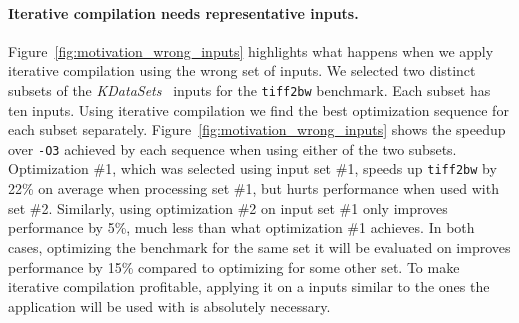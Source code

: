     \paragraph{Iterative compilation needs representative inputs.} 

    Figure~\ref{fig:motivation_wrong_inputs} highlights what happens when we apply iterative compilation using the wrong set of inputs. We
    selected two distinct subsets of the \textit{KDataSets}~\cite{chen10,chen12a} inputs for the \texttt{tiff2bw} benchmark. Each subset
    has ten inputs. Using iterative compilation we find the best optimization sequence for each subset separately.
    Figure~\ref{fig:motivation_wrong_inputs} shows the speedup over \texttt{-O3} achieved by each sequence when using either of the two
    subsets. Optimization \#1, which was selected using input set \#1, speeds up \texttt{tiff2bw} by 22\% on average when processing set
    \#1, but hurts performance when used with set \#2. Similarly, using optimization \#2 on input set \#1 only improves performance by 5\%,
    much less than what optimization \#1 achieves. In both cases, optimizing the benchmark for the same set it will be evaluated on
    improves performance by 15\% compared to optimizing for some other set. To make iterative compilation profitable, applying it on a
    inputs similar to the ones the application will be used with is absolutely necessary.
    
